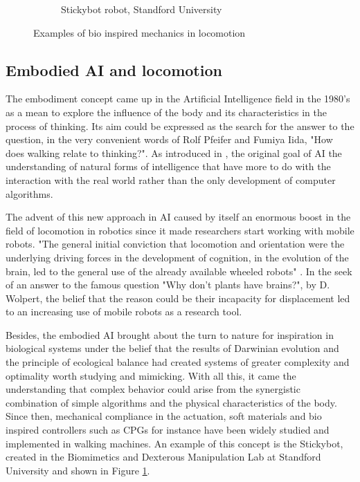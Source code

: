 \begin{figure}[h]
\begin{subfigure}[b]{0.45\textwidth}
        \caption{Stickybot robot, Standford University}
        \label{fig:stickybot}
    \end{subfigure}
\caption{Examples of bio inspired mechanics in locomotion}
\label{fig:figure1}
\end{figure}

\subsection{Embodied AI and locomotion} %
\label{sub:the_embodiment_}
The embodiment concept came up in the Artificial Intelligence field in the 1980's as a mean to explore the influence of the body and its characteristics in the process of thinking. 
Its aim could be expressed as the search for the answer to the question, in the very convenient words of Rolf Pfeifer and Fumiya Iida, "How does walking relate to thinking?".
As introduced in \cite{pfeifer}, the original goal of AI the understanding of natural forms of intelligence that have more to do with the interaction with the real world rather than the only development of computer algorithms.

The advent of this new approach in AI caused by itself an enormous boost in the field of locomotion in robotics since it made researchers start working with mobile robots.
"The general initial conviction that locomotion and orientation were the underlying driving forces in the development of cognition, in the evolution of the brain, led to the general use of the already available wheeled robots" \cite{pfeifer}.
In the seek of an answer to the famous question "Why don’t plants have brains?", by D. Wolpert, the belief that the reason could be their incapacity for displacement led to an increasing use of mobile robots as a research tool.

Besides, the embodied AI brought about the turn to nature for inspiration in biological systems under the belief that the results of Darwinian evolution and the principle of ecological balance had created systems of greater complexity and optimality worth studying and mimicking.
With all this, it came the understanding that complex behavior could arise from the synergistic combination of simple algorithms and the physical characteristics of the body.
Since then, mechanical compliance in the actuation, soft materials and bio inspired controllers such as CPGs for instance have been widely studied and implemented in walking machines. 
An example of this concept is the Stickybot, created in the Biomimetics and Dexterous Manipulation Lab at Standford University and shown in Figure \ref{fig:stickybot}.

